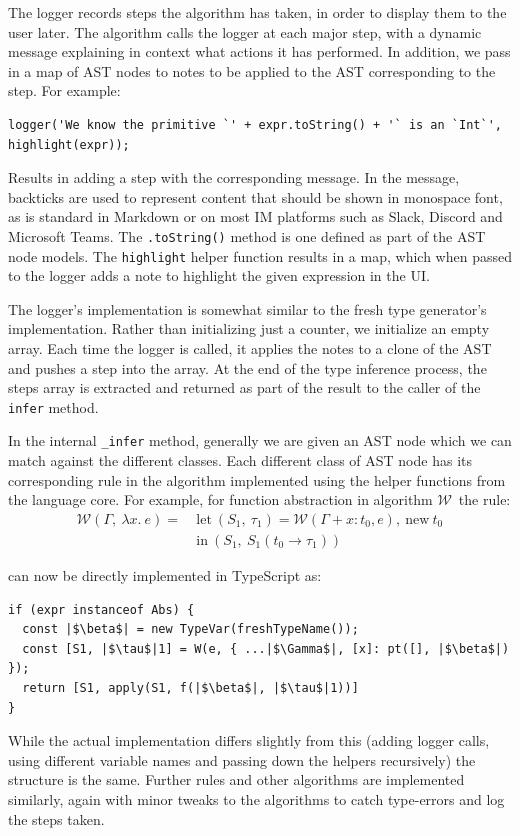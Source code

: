 \documentclass[a4paper,fleqn,oneside,12pt]{report}
\newcommand{\W}{$\mathcal{W}$}
\begin{document}
The logger records steps the algorithm has taken, in order to display them to the user later. The algorithm calls the logger at each major step, with a dynamic message explaining in context what actions it has performed. In addition, we pass in a map of AST nodes to notes to be applied to the AST corresponding to the step. For example:

\begin{verbatim}
logger('We know the primitive `' + expr.toString() + '` is an `Int`', highlight(expr));
\end{verbatim}

Results in adding a step with the corresponding message. In the message, backticks are used to represent content that should be shown in monospace font, as is standard in Markdown or on most IM platforms such as Slack, Discord and Microsoft Teams. The \texttt{.toString()} method is one defined as part of the AST node models. The \texttt{highlight} helper function results in a map, which when passed to the logger adds a note to highlight the given expression in the UI.

The logger's implementation is somewhat similar to the fresh type generator's implementation. Rather than initializing just a counter, we initialize an empty array. Each time the logger is called, it applies the notes to a clone of the AST and pushes a step into the array. At the end of the type inference process, the steps array is extracted and returned as part of the result to the caller of the \texttt{infer} method.

In the internal \texttt{_infer} method, generally we are given an AST node which we can match against the different classes. Each different class of AST node has its corresponding rule in the algorithm implemented using the helper functions from the language core. For example, for function abstraction in algorithm \W\ the rule:
\begin{align*}
\mathcal{W}(\Gamma,\ \lambda x.\ e  ) =\ & \textrm{let}\ (S_1,\ \tau_1) = \mathcal{W}(\Gamma + x : t_0, e),\ \textrm{new}\ t_0\\
& \textrm{in}\ (S_1,\ S_1(t_0 \rightarrow \tau_1))
\end{align*}

can now be directly implemented in TypeScript as:

\begin{verbatim}
if (expr instanceof Abs) {
  const |$\beta$| = new TypeVar(freshTypeName());
  const [S1, |$\tau$|1] = W(e, { ...|$\Gamma$|, [x]: pt([], |$\beta$|) });
  return [S1, apply(S1, f(|$\beta$|, |$\tau$|1))]
}
\end{verbatim}
While the actual implementation differs slightly from this (adding logger calls, using different variable names and passing down the helpers recursively) the structure is the same. Further rules and other algorithms are implemented similarly, again with minor tweaks to the algorithms to catch type-errors and log the steps taken.
\end{document}
